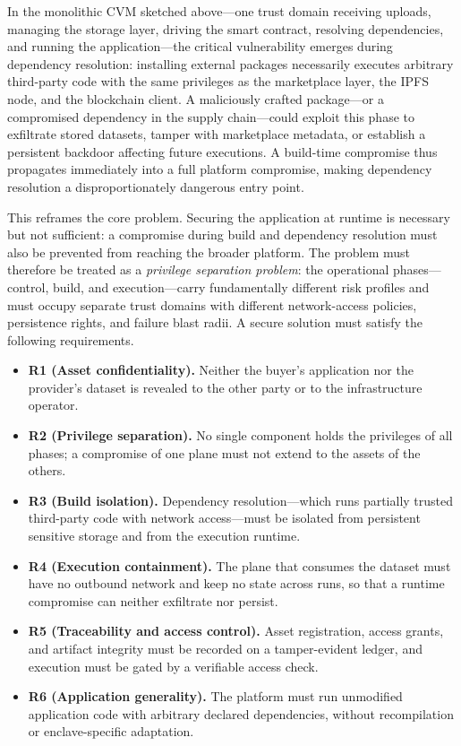 \documentclass[runningheads]{llncs}
\begin{document}
In the monolithic CVM sketched above---one trust domain receiving uploads, managing the
storage layer, driving the smart contract, resolving dependencies, and running the
application---the critical vulnerability emerges during dependency resolution: installing
external packages necessarily executes arbitrary third-party code with the same privileges
as the marketplace layer, the IPFS node, and the blockchain client. A maliciously crafted
package---or a compromised dependency in the supply chain---could exploit this phase to
exfiltrate stored datasets, tamper with marketplace metadata, or establish a persistent
backdoor affecting future executions. A build-time compromise thus propagates immediately
into a full platform compromise, making dependency resolution a disproportionately
dangerous entry point.

This reframes the core problem. Securing the application at runtime is necessary but not
sufficient: a compromise during build and dependency resolution must also be prevented from
reaching the broader platform. The problem must therefore be treated as a \textit{privilege
separation problem}: the operational phases---control, build, and execution---carry
fundamentally different risk profiles and must occupy separate trust domains with different
network-access policies, persistence rights, and failure blast radii. A secure solution must
satisfy the following requirements.

\begin{itemize}[leftmargin=*,itemsep=1pt,topsep=2pt,parsep=0pt]
\item \textbf{R1 (Asset confidentiality).} Neither the buyer's application nor the
  provider's dataset is revealed to the other party or to the infrastructure operator.
\item \textbf{R2 (Privilege separation).} No single component holds the privileges of all
  phases; a compromise of one plane must not extend to the assets of the others.
\item \textbf{R3 (Build isolation).} Dependency resolution---which runs partially trusted
  third-party code with network access---must be isolated from persistent sensitive storage
  and from the execution runtime.
\item \textbf{R4 (Execution containment).} The plane that consumes the dataset must have no
  outbound network and keep no state across runs, so that a runtime compromise can neither
  exfiltrate nor persist.
\item \textbf{R5 (Traceability and access control).} Asset registration, access grants, and
  artifact integrity must be recorded on a tamper-evident ledger, and execution must be
  gated by a verifiable access check.
\item \textbf{R6 (Application generality).} The platform must run unmodified application
  code with arbitrary declared dependencies, without recompilation or enclave-specific
  adaptation.
\end{itemize}
\end{document}
